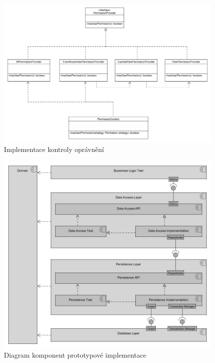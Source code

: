 \documentclass[11pt,twoside,a4paper]{book}
\begin{document}
\begin{figure}
\begin{center}
\includegraphics[width=1.3\linewidth, angle=90]{figures/permission-class}
\caption{Implementace kontroly oprávnění}
\label{fig:impl-permission}
\end{center}
\end{figure}

\begin{figure}
\begin{center}
\includegraphics[width=14cm]{figures/modules}
\caption{Diagram komponent prototypové implementace}
\label{fig:poc_components}
\end{center}
\end{figure}
\end{document}
